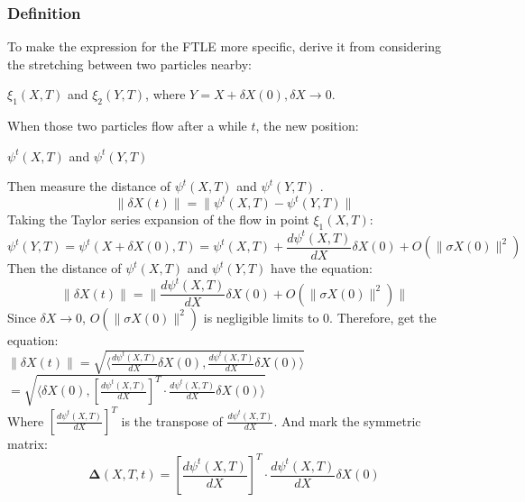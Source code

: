\documentclass[
     11pt,         %
     a4paper,      %
     oneside,
     ]{article}
\newcommand{\vect}[1]{\boldsymbol{#1}}
\begin{document}
\subsubsection{Definition}
To make the expression for the FTLE more specific, derive it from considering the stretching between two particles nearby:\\
\begin{center}
	$\xi_{1}(X,T)$ and $\xi_{2}(Y,T)$, where $Y=X+\delta X(0), \delta X\rightarrow 0$. \\
\end{center}
When those two particles flow after a while $t$, the new position:\\
\begin{center}
	$\psi^{t}(X,T)$ and $\psi^{t}(Y,T)$ 
\end{center}
Then measure the distance of $\psi^{t}(X,T)$ and $\psi^{t}(Y,T)$ .\\
$$\lVert\delta X(t)\rVert=\lVert\psi^{t}(X,T)-\psi^{t}(Y,T)\rVert$$
Taking the Taylor series expansion of the flow in point $\xi_{1}(X,T)$:\\
$$\psi^{t}(Y,T)=\psi^{t}(X+\delta X(0),T)=\psi^{t}(X,T)+\frac{d\psi^{t}(X,T)}{dX}\delta X(0)+O(\lVert\sigma X(0)\rVert^{2})$$
Then the distance of $\psi^{t}(X,T)$ and $\psi^{t}(Y,T)$ have the equation:\\
$$\lVert\delta X(t)\rVert =\biggr\rVert\frac{d\psi^{t}(X,T)}{dX}\delta X(0)+O(\lVert\sigma X(0)\rVert^{2})\biggr\lVert $$
Since $\delta X\rightarrow 0$, $O(\lVert\sigma X(0)\rVert^{2})$ is negligible limits to 0. Therefore, get the equation:\\

$\lVert\delta X(t)\rVert =\sqrt{\biggr\langle \frac{d\psi^{t}(X,T)}{dX}\delta X(0),\frac{d\psi^{t}(X,T)}{dX}\delta X(0) \biggr\rangle}$\\
$          =\sqrt{\biggr\langle \delta X(0),[\frac{d\psi^{t}(X,T)}{dX}]^{T}\cdot\frac{d\psi^{t}(X,T)}{dX}\delta X(0) \biggr\rangle}$
\\
Where $[\frac{d\psi^{t}(X,T)}{dX}]^{T}$ is the transpose of $\frac{d\psi^{t}(X,T)}{dX}$. And mark the symmetric matrix:\\
$$\vect{\Delta}(X,T,t)=[\frac{d\psi^{t}(X,T)}{dX}]^{T}\cdot\frac{d\psi^{t}(X,T)}{dX}\delta X(0)$$
\end{document}
